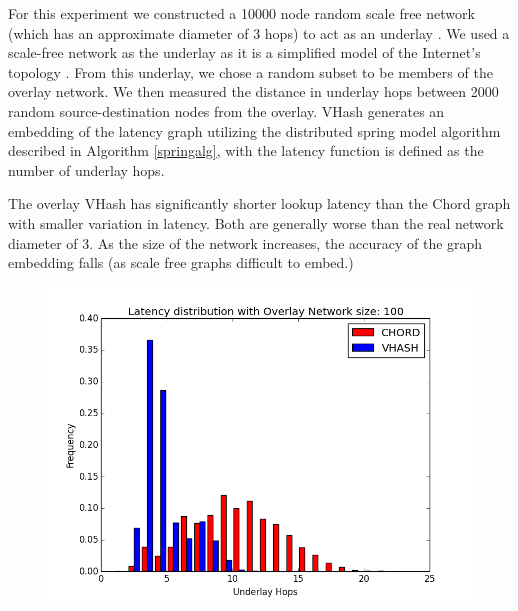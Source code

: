 \documentclass{IEEEtran}
\begin{document}
For this experiment we constructed a 10000 node random scale free network (which has an approximate diameter of 3 hops) to act as an underlay \cite{cohen2000resilience} \cite{pastor2001epidemic} \cite{hagberg2004}.
We used a scale-free network as the underlay as it is a simplified model of the Internet's topology \cite{cohen2000resilience} \cite{pastor2001epidemic}.
From this underlay, we chose a random subset to be members of the overlay network.
We then measured the distance in underlay hops between 2000 random source-destination nodes from the overlay. 
VHash generates an embedding of the latency graph utilizing the distributed spring model algorithm described in Algorithm \ref{springalg}, with the latency function is defined as the number of underlay hops.


The overlay VHash has significantly shorter lookup latency than the Chord graph with smaller variation in latency.
Both are generally worse than the real network diameter of 3.
As the size of the network increases, the accuracy of the graph embedding falls (as scale free graphs difficult to embed.)


\begin{figure}
	\centering
	\includegraphics[width=\linewidth]{hist_100}
	\label{hist100}
\end{figure}
\end{document}
